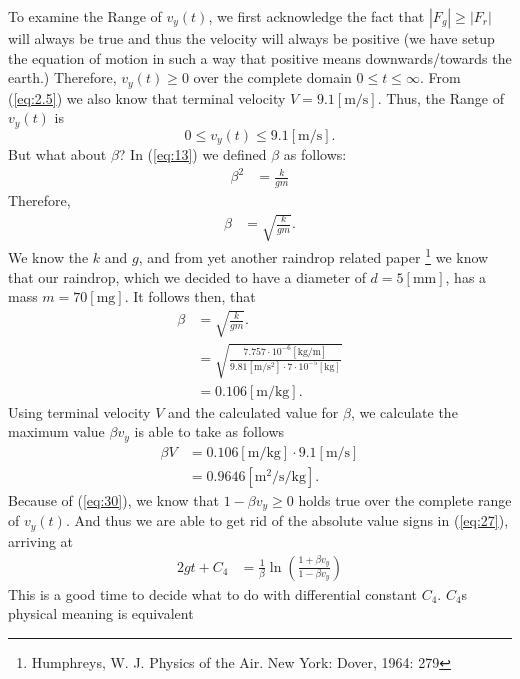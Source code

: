 \documentclass[paper=a4, fontsize=11pt]{scrartcl} %
\numberwithin{equation}{section} %
\numberwithin{figure}{section} %
\numberwithin{table}{section} %
\begin{document}
To examine the Range of $v_y(t)$,
we first acknowledge the fact that $|F_g| \geq |F_r|$ will always be true and thus the velocity will always be positive 
(we have setup the equation of motion in such a way that positive means downwards/towards the earth.) Therefore, $v_y(t) \geq 0$ over the 
complete domain $0 \leq t \leq \infty$. From (\ref{eq:2.5}) we also know that terminal velocity $V = 9.1[\si{\meter\per\second}]$.
Thus, the Range of $v_y(t)$ is 
\begin{equation} 
0 \leq v_y(t) \leq 9.1[\si{\meter\per\second}].
\end{equation}
But what about $\beta$? In (\ref{eq:13}) we defined $\beta$ as follows:
\begin{align} \label{eq:13.1}
\beta^2 &= \frac{k}{gm}
\end{align}
Therefore,
\begin{align} \label{eq:28}
\beta &= \sqrt{\frac{k}{gm}}.
\end{align}
We know the $k$ and $g$, and from yet another raindrop related paper
\footnote{Humphreys, W. J. Physics of the Air. New York: Dover, 1964: 279} we know that our raindrop, which we decided to have a diameter of
$d = 5 [\si{\milli\meter}]$, has a mass $m = 70 [\si{\milli\gram}]$.
It follows then, that
\begin{align} \label{eq:29}
\beta &= \sqrt{\frac{k}{gm}}. \\
      &= \sqrt{\frac{7.757 \cdot 10^{-6}[\si{\kilogram\per\meter}]}{9.81 [\si{\meter\per\second\squared}] \cdot 7 \cdot 10^{-5} [\si{\kilo\gram}]}} \\
      &= 0.106 [\si{\meter\per\kilo\gram}].
\end{align}
Using terminal velocity $V$ and the calculated value for $\beta$, we calculate the maximum value $\beta v_y$ is able to take as follows 
\begin{align} 
\beta V &= 0.106 [\si{\meter\per\kilo\gram}] \cdot 9.1[\si{\meter\per\second}] \\
        &= 0.9646 [\si{\meter\squared\per\second\per\kilo\gram}] .\label{eq:30}
\end{align}
Because of (\ref{eq:30}), we know that $1 - \beta v_y \geq 0$ holds true over the complete range of $v_y(t)$. And thus we are able to
get rid of the absolute value signs in (\ref{eq:27}), arriving at
\begin{align} 
2g t + C_4 &=  \frac{1}{\beta} \ln{\left(\frac{1 + \beta v_y}{1 - \beta v_y} \right)} \label{eq:31}
\end{align}
This is a good time to decide what to do with differential constant $C_4$. $C_4$s physical meaning is equivalent 
\end{document}
